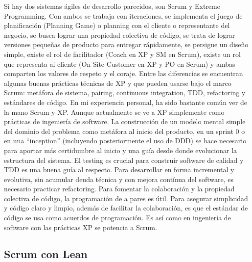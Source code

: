 Si hay dos sistemas ágiles de desarrollo parecidos, son Scrum y Extreme Programming. Con ambos se trabaja con iteraciones, se implementa el juego de planificación (Planning Game) o planning con el cliente o representante del negocio, se busca lograr una propiedad colectiva de código, se trata de lograr versiones pequeñas de producto para entregar rápidamente, se persigue un diseño simple, existe el rol de facilitador (Coach en XP y SM en Scrum), existe un rol que representa al cliente (On Site Customer en XP y PO en Scrum) y ambas comparten los valores de respeto y el coraje. Entre las diferencias se encuentran algunas buenas prácticas técnicas de XP y que pueden usarse bajo el marco Scrum: metáfora de sistema, pairing, continuous integration, TDD, refactoring y estándares de código. 
En mi experiencia personal, ha sido bastante común ver de la mano Scrum y XP. Aunque actualmente se ve a XP simplemente como prácticas de ingeniería de software. La construcción de un modelo mental simple del dominio del problema como metáfora al inicio del producto, en un sprint 0 o en una “inception” (incluyendo posteriormente el uso de DDD) se hace necesario para aportar más certidumbre al inicio y una guía desde donde evolucionar la estructura del sistema. El testing es crucial para construir software de calidad y TDD es una buena guía al respecto. Para desarrollar en forma incremental y evolutiva, sin acumular deuda técnica y con mejora contínua del software, es necesario practicar refactoring. Para fomentar la colaboración y la propiedad colectiva de código, la programación de a pares es útil. Para asegurar simplicidad y código claro y limpio, además de facilitar la colaboración, es que el estándar de código se usa como acuerdos de programación. Es así como en ingeniería de software con las prácticas XP se potencia a Scrum.

\subsection{Scrum con Lean}

